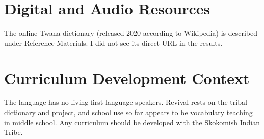 \documentclass[12pt]{article}
\begin{document}
\section{Digital and Audio Resources}
The online Twana dictionary (released 2020 according to Wikipedia) is described under Reference Materials. I did not see its direct URL in the results.

\section{Curriculum Development Context}
The language has no living first-language speakers. Revival rests on the tribal dictionary and project, and school use so far appears to be vocabulary teaching in middle school. Any curriculum should be developed with the Skokomish Indian Tribe.
\end{document}
